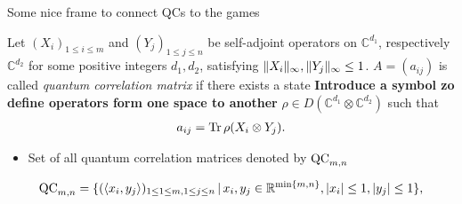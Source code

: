 \begin{frame}
	Some nice frame to connect QCs to the games 
\end{frame}

\begin{frame}
	\begin{definition}
		Let $ (X_i)_{1 \le i \le m } $ and $ (Y_j)_{1 \le j \le n} $ be self-adjoint operators on $ \mathbb{C}^{d_1} $, respectively $ \mathbb{C}^{d_2} $ for some positive integers $ d_1,d_2 $, satisfying $  \Vert {X_i} \Vert_{\infty},  \Vert {Y_j} \Vert_{\infty} \le 1 $. $ A = (a_{ij}) $ is called {\itshape quantum correlation matrix} if there exists a state \textbf{Introduce a symbol zo define operators form one space to another} $ \rho \in D(\mathbb{C}^{d_1} \otimes \mathbb{C}^{d_2})$ such that 
		\begin{align*}\label{QCaij}
		a_{ij} = \text{Tr} \, {\rho (X_i \otimes Y_j)} .
		\end{align*}
	\end{definition}
	\pause
	\begin{itemize}
		\item Set of all quantum correlation matrices denoted by $ \textup{QC}_{m,n} $
	\end{itemize}
	\begin{lemma}
		\begin{align*}
		\textup{QC}_{m,n} = \{ (\langle x_i,y_j \rangle)_{1 \le 1 \le m, 1 \le j \le n} \,| \, x_i,y_j \in \mathbb{R}^{ \min \{m,n \} }, \vert x_i  \vert \le 1, \vert y_j \vert \le 1  \},
		\end{align*}
	\end{lemma}
\end{frame}


